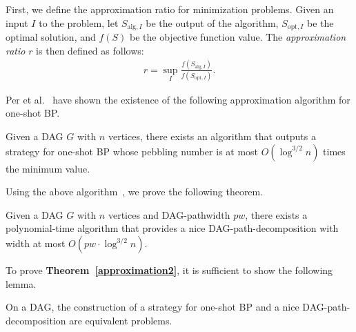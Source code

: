 \documentclass[runningheads]{llncs}
\theoremstyle{plain}
\theoremstyle{definition}
\begin{document}
First, we define the approximation ratio for minimization problems. Given an input $I$ to the problem, let $S_{\mathrm{alg}, I}$ be the output of the algorithm, $S_{\mathrm{opt}, I}$ be the optimal solution, and $f(S)$ be the objective function value. The \emph{approximation ratio} $r$ is then defined as follows:
\begin{align*}
    r = \sup_{I}\frac{f(S_{\mathrm{alg}, I})}{f(S_{\mathrm{opt}, I})}.
\end{align*}

Per et al.~\cite{art20} have shown the existence of the following approximation algorithm for one-shot BP.

\begin{proposition}
    Given a DAG $G$ with $n$ vertices, there exists an algorithm that outputs a strategy for one-shot BP whose pebbling number is at most $O(\log ^{3/2} n)$ times the minimum value.
\end{proposition}

Using the above algorithm~\cite{art20}, we prove the following theorem.

\begin{theorem}\label{approximation2}
    Given a DAG $G$ with $n$ vertices and DAG-pathwidth $pw$, there exists a polynomial-time algorithm that provides a nice DAG-path-decomposition with width at most $O(pw \cdot \log ^{3/2} n)$.
\end{theorem}

To prove \textbf{Theorem~\ref{approximation2}}, it is sufficient to show the following lemma.

\begin{lemma}\label{lemma_approximation2}
    On a DAG, the construction of a strategy for one-shot BP and a nice DAG-path-decomposition are equivalent problems.
\end{lemma}
\end{document}
